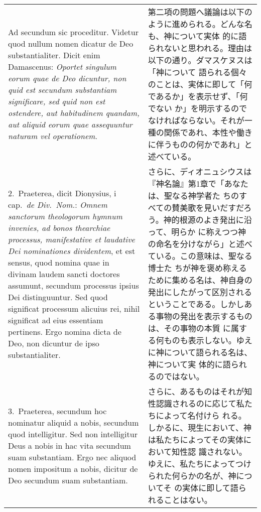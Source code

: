 \documentclass[10pt]{jsarticle}
\begin{document}
\begin{longtable}{p{21em}p{21em}}

{\sc Ad secundum sic proceditur}. Videtur quod nullum nomen dicatur de
Deo substantialiter. Dicit enim Damascenus: {\it Oportet singulum
eorum quae de Deo dicuntur, non quid est secundum substantiam
significare, sed quid non est ostendere, aut habitudinem quandam, aut
aliquid eorum quae assequuntur naturam vel operationem}.

&

第二項の問題へ議論は以下のように進められる。どんな名も、神について実体
的に語られないと思われる。理由は以下の通り。ダマスケヌスは「神について
語られる個々のことは、実体に即して「何であるか」を表示せず、「何でない
か」を明示するのでなければならない。それが一種の関係であれ、本性や働き
に伴うものの何かであれ」と述べている。

\\

2.~{\sc Praeterea}, dicit Dionysius, {\sc i} cap.\ {\it de Div.\
Nom.}: {\it Omnem sanctorum theologorum hymnum invenies, ad bonos
thearchiae processus, manifestative et laudative Dei nominationes
dividentem}, et est sensus, quod nomina quae in divinam laudem sancti
doctores assumunt, secundum processus ipsius Dei distinguuntur. Sed
quod significat processum alicuius rei, nihil significat ad eius
essentiam pertinens. Ergo nomina dicta de Deo, non dicuntur de ipso
substantialiter.

&

さらに、ディオニュシウスは『神名論』第1章で「あなたは、聖なる神学者た
ちのすべての賛美歌を見いだすだろう。神的根源のよき発出に沿って、明らか
に称えつつ神の命名を分けながら」と述べている。この意味は、聖なる博士た
ちが神を褒め称えるために集める名は、神自身の発出にしたがって区別される
ということである。しかしある事物の発出を表示するものは、その事物の本質
に属する何ものも表示しない。ゆえに神について語られる名は、神について実
体的に語られるのではない。

\\

3.~{\sc Praeterea}, secundum hoc nominatur aliquid a nobis, secundum
quod intelligitur. Sed non intelligitur Deus a nobis in hac vita
secundum suam substantiam. Ergo nec aliquod nomen impositum a nobis,
dicitur de Deo secundum suam substantiam.

&

さらに、あるものはそれが知性認識されるのに応じて私たちによって名付けら
れる。しかるに、現生において、神は私たちによってその実体において知性認
識されない。ゆえに、私たちによってつけられた何らかの名が、神についてそ
の実体に即して語られることはない。


\end{longtable}
\end{document}
